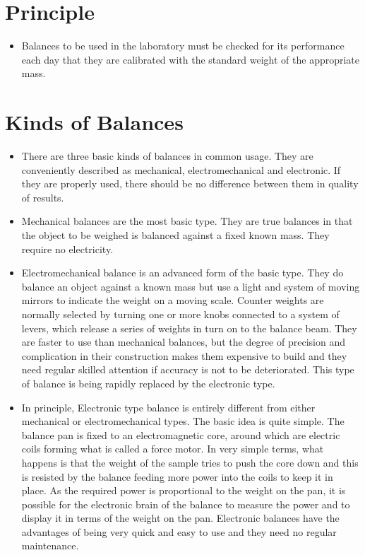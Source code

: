 \documentclass[]{book}
\providecommand{\tightlist}{%
  \setlength{\itemsep}{0pt}\setlength{\parskip}{0pt}}
\begin{document}
\section{Principle}\label{principle-1}

\begin{itemize}
\tightlist
\item
  Balances to be used in the laboratory must be checked for its
  performance each day that they are calibrated with the standard weight
  of the appropriate mass.
\end{itemize}

\section{Kinds of Balances}\label{kinds-of-balances}

\begin{itemize}
\tightlist
\item
  There are three basic kinds of balances in common usage. They are
  conveniently described as mechanical, electromechanical and
  electronic. If they are properly used, there should be no difference
  between them in quality of results.
\item
  Mechanical balances are the most basic type. They are true balances in
  that the object to be weighed is balanced against a fixed known mass.
  They require no electricity.
\item
  Electromechanical balance is an advanced form of the basic type. They
  do balance an object against a known mass but use a light and system
  of moving mirrors to indicate the weight on a moving scale. Counter
  weights are normally selected by turning one or more knobs connected
  to a system of levers, which release a series of weights in turn on to
  the balance beam. They are faster to use than mechanical balances, but
  the degree of precision and complication in their construction makes
  them expensive to build and they need regular skilled attention if
  accuracy is not to be deteriorated. This type of balance is being
  rapidly replaced by the electronic type.
\item
  In principle, Electronic type balance is entirely different from
  either mechanical or electromechanical types. The basic idea is quite
  simple. The balance pan is fixed to an electromagnetic core, around
  which are electric coils forming what is called a force motor. In very
  simple terms, what happens is that the weight of the sample tries to
  push the core down and this is resisted by the balance feeding more
  power into the coils to keep it in place. As the required power is
  proportional to the weight on the pan, it is possible for the
  electronic brain of the balance to measure the power and to display it
  in terms of the weight on the pan. Electronic balances have the
  advantages of being very quick and easy to use and they need no
  regular maintenance.
\end{itemize}
\end{document}
